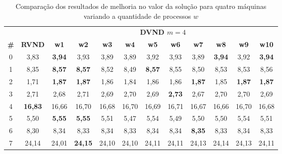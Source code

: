 \begin{table}[htbp]
\caption{Comparação dos resultados de melhoria no valor da solução para quatro máquinas variando a quantidade de processos $w$}
\begin{center}
\begin{tabular}{cccccccccccc}
\hline
\hline
\multicolumn{2}{c}{} &\multicolumn{10}{c}{\textbf{DVND $m=4$}} \\
\cline{3-12}
\textbf{\#} & \textbf{RVND}& \textbf{w1}& \textbf{w2}& \textbf{w3}& \textbf{w4}& \textbf{w5}& \textbf{w6}& \textbf{w7}& \textbf{w8}& \textbf{w9}& \textbf{w10} \\
\hline
0 & 3,83& \textbf{3,94}& 3,93& 3,89& 3,89& 3,92& 3,93& 3,89& \textbf{3,94}& 3,92& \textbf{3,94} \\
1 & 8,35& \textbf{8,57}& \textbf{8,57}& 8,52& 8,49& \textbf{8,57}& 8,55& 8,50& 8,53& 8,53& 8,56 \\
2 & 1,71& \textbf{1,87}& \textbf{1,87}& 1,86& 1,84& 1,86& 1,86& \textbf{1,87}& 1,85& \textbf{1,87}& \textbf{1,87} \\
3 & 2,71& 2,68& 2,71& 2,69& 2,70& 2,69& \textbf{2,73}& 2,67& 2,70& 2,70& 2,69 \\
4 &\textbf{16,83}&16,66&16,70&16,68&16,70&16,69&16,71&16,67&16,66&16,70&16,68 \\
5 & 5,50& \textbf{5,55}& \textbf{5,55}& 5,51& 5,47& 5,54& 5,49& 5,50& 5,50& 5,54& 5,51 \\
6 & 8,30& 8,34& 8,33& 8,34& 8,33& 8,34& 8,34& \textbf{8,35}& 8,33& 8,34& 8,33 \\
7 &24,14&24,01&\textbf{24,15}&24,10&24,10&24,11&24,11&24,13&24,14&24,13&24,11 \\
\hline
\end{tabular}
\label{tab:rvndDvndN4imp}
\end{center}
\end{table}